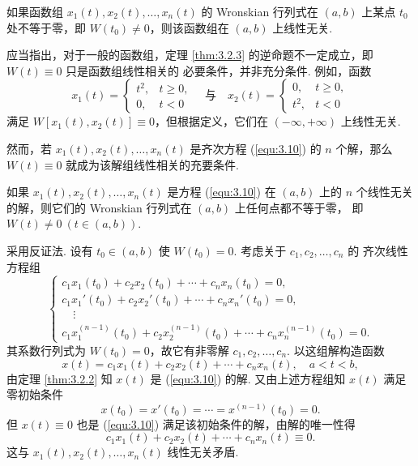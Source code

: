 \begin{cor}\label{cor:3.2.1}
如果函数组 $x_1(t),x_2(t),\dots,x_n(t)$ 的 Wronskian 行列式在 $(a,b)$ 上某点
$t_0$ 处不等于零，即 $W(t_0)\neq0$，则该函数组在 $(a,b)$ 上线性无关.
\end{cor}

\begin{rmk}
应当指出，对于一般的函数组，定理 \ref{thm:3.2.3} 的逆命题不一定成立，即 $W(t)\equiv0$ 只是函数组线性相关的
必要条件，并非充分条件. 例如，函数
\[
x_1(t)=
\begin{cases}
t^2, & t\ge0,\\
0, & t<0
\end{cases}
\quad\text{与}\quad
x_2(t)=
\begin{cases}
0, & t\ge0,\\
t^2, & t<0
\end{cases}
\]
满足 $W[x_1(t),x_2(t)]\equiv0$，但根据定义，它们在 $(-\infty,+\infty)$ 上线性无关.

然而，若 $x_1(t),x_2(t),\dots,x_n(t)$ 是齐次方程 (\ref{equ:3.10}) 的
$n$ 个解，那么 $W(t)\equiv0$ 就成为该解组线性相关的充要条件.
\end{rmk}

\begin{thm}\label{thm:3.2.4}
如果 $x_1(t),x_2(t),\dots,x_n(t)$ 是方程 (\ref{equ:3.10}) 在 $(a,b)$ 上的
$n$ 个线性无关的解，则它们的 Wronskian 行列式在 $(a,b)$ 上任何点都不等于零，
即 $W(t)\neq0\ (t\in(a,b))$.
\end{thm}
\begin{pf1}
采用反证法. 设有 $t_0\in(a,b)$ 使 $W(t_0)=0$. 考虑关于 $c_1,c_2,\dots,c_n$ 的
齐次线性方程组
\[
\begin{cases}
c_1x_1(t_0)+c_2x_2(t_0)+\cdots+c_nx_n(t_0)=0,\\
c_1x_1'(t_0)+c_2x_2'(t_0)+\cdots+c_nx_n'(t_0)=0,\\
\quad\vdots\\
c_1x_1^{(n-1)}(t_0)+c_2x_2^{(n-1)}(t_0)+\cdots+c_nx_n^{(n-1)}(t_0)=0.
\end{cases}
\]
其系数行列式为 $W(t_0)=0$，故它有非零解 $c_1,c_2,\dots,c_n$. 以这组解构造函数
\[
x(t)=c_1x_1(t)+c_2x_2(t)+\cdots+c_nx_n(t),\quad a<t<b,
\]
由定理 \ref{thm:3.2.2} 知 $x(t)$ 是 (\ref{equ:3.10}) 的解. 又由上述方程组知
$x(t)$ 满足零初始条件
\[
x(t_0)=x'(t_0)=\cdots=x^{(n-1)}(t_0)=0.
\]
但 $x(t)\equiv0$ 也是 (\ref{equ:3.10}) 满足该初始条件的解，由解的唯一性得
\[
c_1x_1(t)+c_2x_2(t)+\cdots+c_nx_n(t)\equiv0.
\]
这与 $x_1(t),x_2(t),\dots,x_n(t)$ 线性无关矛盾.
\end{pf1}

